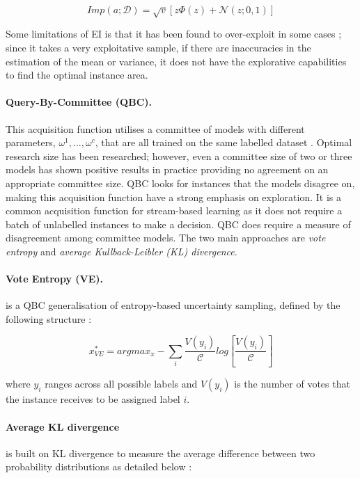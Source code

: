 \documentclass[ %
                    author={James Stephenson},
                supervisor={Dr. Edwin Simpson},
                    degree={MSc},
                     title={Project Plan: Bayesian Deep Learning For Extractive Test Summarisation},
                  subtitle={},
                      type={},
                      year={2022}]{../additions/dissertation}
\begin{document}
		$$
			Imp(a; \mathcal{D}) = \sqrt{v}\left[z \Phi(z) + \mathcal{N}(z; 0, 1)\right]
		$$	

\noindent
Some limitations of EI is that it has been found to over-exploit in some cases \cite{Qin17}; since it takes a very exploitative sample, if there are inaccuracies in the estimation of the mean or variance, it does not have the explorative capabilities to find the optimal instance area.

\paragraph{Query-By-Committee (QBC).} This acquisition function utilises a committee of models with different parameters, ${\omega^1, \ldots, \omega^{c}}$, that are all trained on the same labelled dataset \cite{Seung92}. Optimal research size has been researched; however, even a committee size of two or three models has shown positive results in practice \cite{Seung92, Craven08, Nigam98} providing no agreement on an appropriate committee size. QBC looks for instances that the models disagree on, making this acquisition function have a strong emphasis on exploration. It is a common acquisition function for stream-based learning \cite{Settles09} as it does not require a batch of unlabelled instances to make a decision. QBC does require a measure of disagreement among committee models. The two main approaches are \emph{vote entropy} and \emph{average Kullback-Leibler (KL) divergence}. 

		\paragraph{Vote Entropy (VE).} is a QBC generalisation of entropy-based uncertainty sampling, defined by the following structure \cite{Dagan95}:

		$$
			x^\ast_{VE} = argmax_x - \sum_i \frac{V(y_i)}{\mathcal{C}} log \left[\frac{V(y_i)}{\mathcal{C}}\right]
		$$
		
		\noindent
		where $y_i$ ranges across all possible labels and $V(y_i)$ is the number of votes that the instance receives to be assigned label $i$.

		\paragraph{Average KL divergence} is built on KL divergence \cite{Kullback51} to measure the average difference between two probability distributions as detailed below \cite{Nigam98}:
\end{document}
